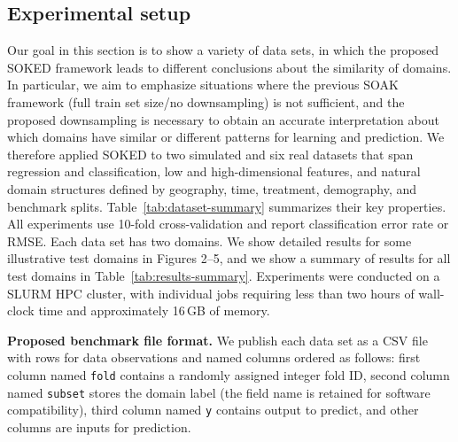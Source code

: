 \documentclass[twoside]{article}
\begin{document}
\subsection{Experimental setup}
\label{sec:datasets}
Our goal in this section is to show a variety of data sets, in which the proposed SOKED framework leads to different conclusions about the similarity of domains.
In particular, we aim to emphasize situations where the previous SOAK framework \citep{hocking2026} (full train set size/no downsampling) is not sufficient, and the proposed downsampling is necessary to obtain an accurate interpretation about which domains have similar or different patterns for learning and prediction.
We therefore applied SOKED to two simulated and six real datasets that span regression and classification, low and high-dimensional features, and natural domain structures defined by geography, time, treatment, demography, and benchmark splits.
Table~\ref{tab:dataset-summary} summarizes their key properties.
All experiments use 10-fold cross-validation and report classification error rate or RMSE.
Each data set has two domains.
We show detailed results for some illustrative test domains in Figures 2--5, and we show a summary of results for all test domains in Table~\ref{tab:results-summary}.
Experiments were conducted on a SLURM HPC cluster, with individual jobs requiring less than two hours of wall-clock time and approximately 16\,GB of memory.


\textbf{Proposed benchmark file format.}
We publish each data set as a CSV file with rows for data observations and named columns ordered as follows: first column named \texttt{fold} contains a randomly assigned integer fold ID, second column named \texttt{subset} stores the domain label (the field name is retained for software compatibility), third column named \texttt{y} contains output to predict, and other columns are inputs for prediction.
\end{document}
